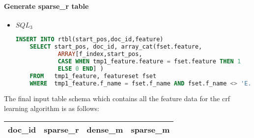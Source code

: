 \paragraph{Generate sparse\_r table}
\begin{itemize}
\item $SQL_3$\\ 
\begin{lstlisting}[language=SQL,gobble=4]
    INSERT INTO rtbl(start_pos,doc_id,feature)
    SELECT start_pos, doc_id, array_cat(fset.feature, 
			ARRAY[f_index,start_pos, 
			CASE WHEN tmp1_feature.feature = fset.feature THEN 1
			ELSE 0 END] )
    FROM   tmp1_feature, featureset fset
    WHERE  tmp1_feature.f_name = fset.f_name AND fset.f_name <> 'E.';
\end{lstlisting}
\end{itemize}



The final input table schema which contains all the feature data for the crf learning algorithm is as follows:
\begin{center}
    \begin{tabular}{ | l | l | l | l |}
    \hline
    doc\_id & sparse\_r & dense\_m & sparse\_m \\ 
    \hline
    \end{tabular}
\end{center}

